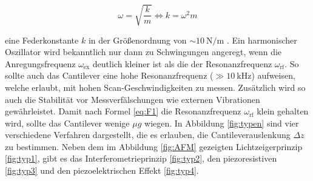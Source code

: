 \begin{equation}
  \omega = \sqrt{\frac{k}{m}}
  \iff
  k = \omega^2 m
  \label{eq:F1}
\end{equation}

\noindent
eine Federkonstante $k$ in der Größenordnung von $\sim\SI{10}{\newton\per\meter}$ \cite[157]{AFM}.
Ein harmonischer Oszillator wird bekanntlich nur dann zu Schwingungen angeregt,
wenn die Anregungs{\-}fre{\-}quenz $\omega_{\text{ex}}$ deutlich kleiner ist als die
der Resonanzfrequenz $\omega_{\text{rf}}$. So sollte auch das Cantilever eine
hohe Resonanzfrequenz ($\gg \SI{10}{\kilo\hertz}$) aufweisen, welche erlaubt,
mit hohen Scan-Geschwindigkeiten zu messen. Zusätzlich wird so auch die Stabilität
vor Messverfälschungen wie externen Vibrationen gewährleistet. Damit nach Formel \ref{eq:F1}
die Resonanzfrequenz $\omega_{\text{rf}}$ klein gehalten wird, sollte das
Cantilever wenige $\mu g$ wiegen. In Abbildung \ref{fig:typen} sind vier verschiedene
Verfahren dargestellt, die es erlauben, die Cantilever{\-}aus{\-}lenkung $\Delta z$ zu bestimmen.
Neben dem im Abbildung \ref{fig:AFM} gezeigten Lichtzeigerprinzip \ref{fig:typ1},
gibt es das Interferometrieprinzip \ref{fig:typ2}, den piezoresistiven
\ref{fig:typ3} und den piezoelektrischen Effekt \ref{fig:typ4}.


